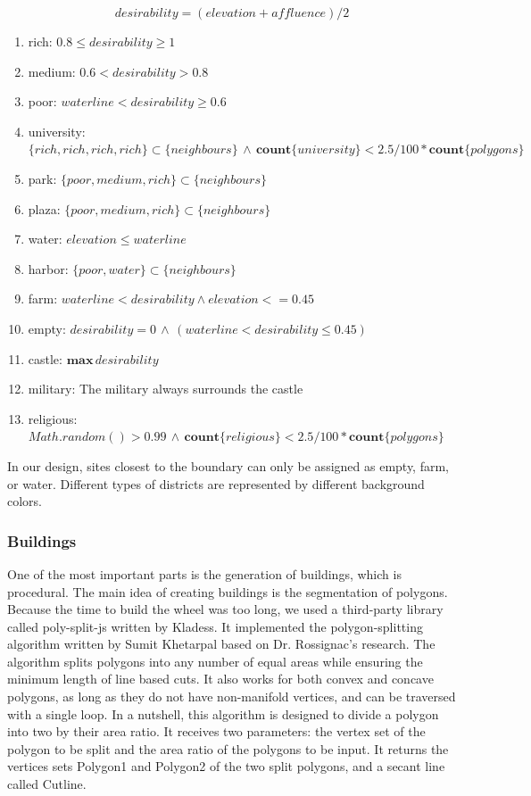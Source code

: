 \[ desirability = (elevation + affluence) / 2 \]

\begin{enumerate}
  \item rich: $0.8 \leq desirability \geq 1$
  \item medium: $0.6 < desirability > 0.8$
  \item poor: $waterline < desirability \geq 0.6$
  \item university: $\{rich, rich, rich, rich\} \subset \{neighbours\} \, \wedge \, \mathbf{count} \{university\} < 2.5 / 100 * \mathbf{count} \{polygons\}$
  \item park: $\{poor, medium, rich\} \subset \{neighbours\}$
  \item plaza: $\{poor, medium, rich\} \subset \{neighbours\}$
  \item water: $elevation \leq waterline$
  \item harbor: $\{poor, water\} \subset \{neighbours\}$
  \item farm: $waterline < desirability \wedge elevation <= 0.45$
  \item empty: $desirability = 0 \, \wedge \, (waterline < desirability \leq 0.45)$
  \item castle: $\mathbf{max}\,desirability$
  \item military: The military always surrounds the castle
  \item religious: $Math.random() > 0.99 \, \wedge \, \mathbf{count} \{religious\} < 2.5 / 100 * \mathbf{count} \{polygons\}$
\end{enumerate}

In our design, sites closest to the boundary can only be assigned as empty, farm, or water. Different types of districts are represented by different background colors.

\subsubsection{Buildings}
One of the most important parts is the generation of buildings, which is procedural.
The main idea of creating buildings is the segmentation of polygons. Because the time to build the wheel was too long, we used a third-party library called poly-split-js written by Kladess. It implemented the polygon-splitting algorithm written by Sumit Khetarpal based on Dr. Rossignac's research. The algorithm splits polygons into any number of equal areas while ensuring the minimum length of line based cuts. It also works for both convex and concave polygons, as long as they do not have non-manifold vertices, and can be traversed with a single loop. In a nutshell, this algorithm is designed to divide a polygon into two by their area ratio. It receives two parameters: the vertex set of the polygon to be split and the area ratio of the polygons to be input. It returns the vertices sets Polygon1 and Polygon2 of the two split polygons, and a secant line called Cutline.

